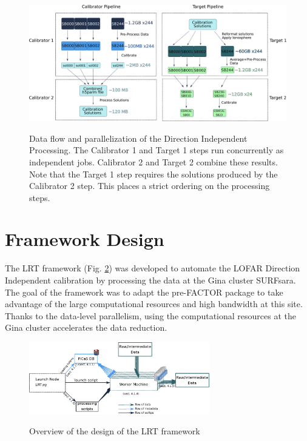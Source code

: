 \begin{figure}[H]
    \centering
 \includegraphics[width=.85\textwidth]{ch3/figures/Pipeline_parallel.eps}\\
    \caption[Parallelization of prefactor processing]{Data flow and parallelization of the Direction Independent Processing. The Calibrator 1 and Target 1 steps run concurrently as independent jobs. Calibrator 2 and Target 2 combine these results. Note that the Target 1 step requires the solutions produced by the Calibrator 2 step. This places a strict ordering on the processing steps. }
 \label{fig:ch3_DIpipe}
\end{figure}



\section{Framework Design}\label{sec:ch3_design}

The LRT framework (Fig. \ref{fig:ch3_design}) was developed to automate the LOFAR Direction Independent calibration by processing the data at the Gina cluster SURFsara\cite{gina_specs}. The goal of the framework was to adapt the pre-FACTOR package to take advantage of the large computational resources and high bandwidth at this site. Thanks to the data-level parallelism, using the computational resources at the Gina cluster accelerates the data reduction. 

\begin{figure}
 \includegraphics[width=0.7\textwidth]{ch3/figures/design.eps}\\
 \caption{Overview of the design of the LRT framework}
 \label{fig:ch3_design}
\end{figure}

